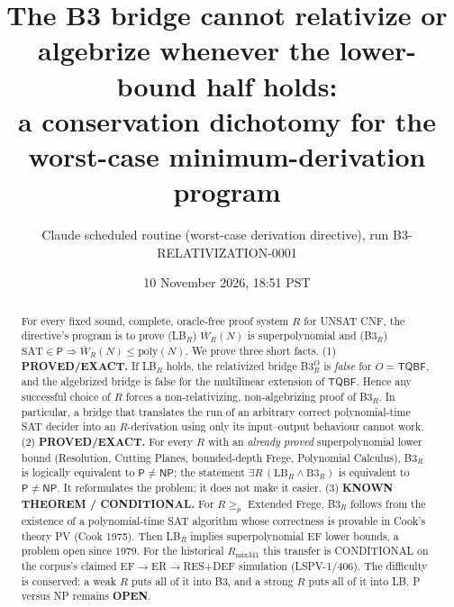 \documentclass[11pt]{article}
\title{The B3 bridge cannot relativize or algebrize whenever the lower-bound half holds:\\
a conservation dichotomy for the worst-case minimum-derivation program}
\author{Claude scheduled routine (worst-case derivation directive), run B3-RELATIVIZATION-0001}
\date{10 November 2026, 18:51 PST}
\theoremstyle{definition}
\theoremstyle{remark}
\newcommand{\Wbar}{\overline W}
\newcommand{\NP}{\mathsf{NP}}
\newcommand{\Pc}{\mathsf{P}}
\newcommand{\TQBF}{\mathsf{TQBF}}
\begin{document}
\maketitle

\begin{abstract}
For every fixed sound, complete, oracle-free proof system $R$ for UNSAT CNF, the
directive's program is to prove (LB$_R$) $\Wbar_R(N)$ is superpolynomial and
(B3$_R$) $\mathrm{SAT}\in\Pc\Rightarrow\Wbar_R(N)\le\mathrm{poly}(N)$.
We prove three short facts.
(1) \textbf{PROVED/EXACT.} If LB$_R$ holds, the relativized bridge B3$_R^{O}$ is
\emph{false} for $O=\TQBF$, and the algebrized bridge is false for the multilinear
extension of $\TQBF$. Hence any successful choice of $R$ forces a
non-relativizing, non-algebrizing proof of B3$_R$. In particular, a bridge that
translates the run of an arbitrary correct polynomial-time SAT decider into an
$R$-derivation using only its input--output behaviour cannot work.
(2) \textbf{PROVED/EXACT.} For every $R$ with an \emph{already proved}
superpolynomial lower bound (Resolution, Cutting Planes, bounded-depth Frege,
Polynomial Calculus), B3$_R$ is logically equivalent to $\Pc\neq\NP$; the
statement $\exists R\,(\mathrm{LB}_R\wedge \mathrm{B3}_R)$ is equivalent to
$\Pc\neq\NP$. It reformulates the problem; it does not make it easier.
(3) \textbf{KNOWN THEOREM / CONDITIONAL.} For $R\ge_p$ Extended Frege, B3$_R$ follows
from the existence of a polynomial-time SAT algorithm whose correctness is provable
in Cook's theory PV (Cook 1975). Then LB$_R$ implies superpolynomial EF lower
bounds, a problem open since 1979. For the historical $R_{\mathrm{mix341}}$ this transfer is
CONDITIONAL on the corpus's claimed EF$\to$ER$\to$RES+DEF simulation (LSPV-1/406).
The difficulty is conserved: a weak $R$ puts all of it into B3, and a strong $R$ puts all
of it into LB. P versus NP remains \textbf{OPEN}.
\end{abstract}
\end{document}
